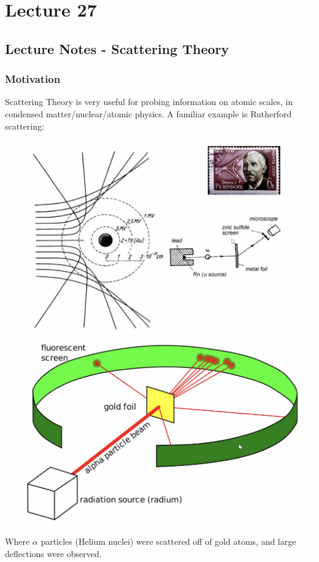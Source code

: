\documentclass[../PHYS306Notes.tex]{subfiles}
\begin{document}
\section{Lecture 27}
\subsection{Lecture Notes - Scattering Theory}
\subsubsection{Motivation}
Scattering Theory is very useful for probing information on atomic scales, in condensed matter/nuclear/atomic physics. A familiar example is Rutherford scattering:
\begin{center}
    \includegraphics[scale=0.5]{Lecture-27/l27-img1.png}
    \includegraphics[scale=0.5]{Lecture-27/l27-img2.png}
\end{center}
Where $\alpha$ particles (Helium nuclei) were scattered off of gold atoms, and large deflections were observed.
\end{document}

